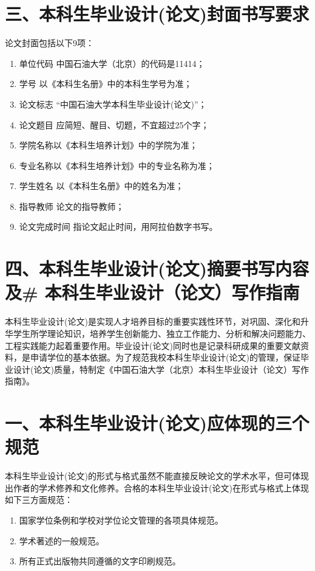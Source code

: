 \documentclass{cupb-thesis}
\begin{document}
\section{三、本科生毕业设计(论文)封面书写要求}

论文封面包括以下9项：

\begin{enumerate}[label=（\arabic*）]
  \item 单位代码    中国石油大学（北京）的代码是11414；
  \item 学号        以《本科生名册》中的本科生学号为准；
  \item 论文标志    “中国石油大学本科生毕业设计(论文)”；
  \item 论文题目    应简短、醒目、切题，不宜超过25个字；
  \item 学院名称以《本科生培养计划》中的学院为准；
  \item 专业名称以《本科生培养计划》中的专业名称为准；
  \item 学生姓名    以《本科生名册》中的姓名为准；
  \item 指导教师    论文的指导教师；
  \item 论文完成时间    指论文起止时间，用阿拉伯数字书写。
\end{enumerate}
\section{四、本科生毕业设计(论文)摘要书写内容及\# 本科生毕业设计（论文）写作指南}

本科生毕业设计(论文)是实现人才培养目标的重要实践性环节，对巩固、深化和升华学生所学理论知识，培养学生创新能力、独立工作能力、分析和解决问题能力、工程实践能力起着重要作用。毕业设计(论文)同时也是记录科研成果的重要文献资料，是申请学位的基本依据。为了规范我校本科生毕业设计(论文)的管理，保证毕业设计(论文)质量，特制定《中国石油大学（北京）本科生毕业设计（论文）写作指南》。

\section{一、本科生毕业设计(论文)应体现的三个规范}

本科生毕业设计(论文)的形式与格式虽然不能直接反映论文的学术水平，但可体现出作者的学术修养和文化修养。合格的本科生毕业设计(论文)在形式与格式上体现如下三方面规范：

\begin{enumerate}[label=\arabic*.]
  \item 国家学位条例和学校对学位论文管理的各项具体规范。
  \item 学术著述的一般规范。
  \item 所有正式出版物共同遵循的文字印刷规范。
\end{enumerate}
\end{document}
